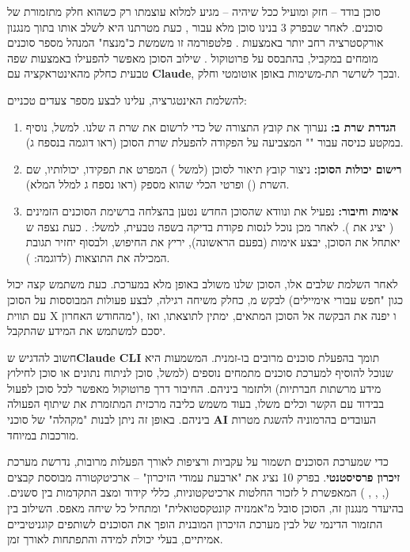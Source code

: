 
סוכן בודד – חזק ומועיל ככל שיהיה – מגיע למלוא עוצמתו רק כשהוא חלק מתזמורת של סוכנים. לאחר שבפרק \num{3} בנינו סוכן  מלא עבור , כעת מטרתנו היא לשלב אותו בתוך מנגנון אורקסטרציה רחב יותר באמצעות . פלטפורמה זו משמשת כ"מנצח" המנהל מספר סוכנים מומחים במקביל, בהתבסס על פרוטוקול . שילוב הסוכן מאפשר להפעילו באמצעות שפה טבעית כחלק מהאינטראקציה עם \textbf{Claude}, ובכך לשרשר תת-משימות באופן אוטומטי וחלק.

להשלמת האינטגרציה, עלינו לבצע מספר צעדים טכניים:
\begin{enumerate}
  \item \textbf{הגדרת שרת ב:} נערוך את קובץ התצורה של  כדי לרשום את שרת ה שלנו. למשל, נוסיף במקטע  כניסה עבור "" המצביעה על הפקודה להפעלת שרת הסוכן (ראו דוגמה בנספח ג).
  \item \textbf{רישום יכולות הסוכן:} ניצור קובץ תיאור לסוכן (למשל ) המפרט את תפקידו, יכולותיו, שם השרת () ופרטי הכלי שהוא מספק (ראו נספח ג למלל המלא).
  \item \textbf{אימות וחיבור:} נפעיל את  ונוודא שהסוכן החדש נטען בהצלחה ברשימת הסוכנים הזמינים ( יציג את ). לאחר מכן נוכל לנסות פקודת בדיקה בשפה טבעית, למשל: . כעת נצפה ש יאתחל את הסוכן, יבצע אימות  (בפעם הראשונה), יריץ את החיפוש, ולבסוף יחזיר תגובת  המכילה את התוצאות (לדוגמה: ).
\end{enumerate}

לאחר השלמת שלבים אלו, הסוכן שלנו משולב באופן מלא במערכת. כעת משתמש קצה יכול לבקש מ, כחלק משיחה רגילה, לבצע פעולות המבוססות על הסוכן (כגון "חפש עבורי אימיילים עם תווית X מהחודש האחרון"), ו יפנה את הבקשה אל הסוכן המתאים, ימתין לתוצאתו, ואז יסכם למשתמש את המידע שהתקבל.

חשוב להדגיש ש\textbf{Claude CLI} תומך בהפעלת סוכנים מרובים בו-זמנית. המשמעות היא שנוכל להוסיף למערכת סוכנים מתמחים נוספים (למשל, סוכן לניתוח נתונים או סוכן לחילוץ מידע מרשתות חברתיות) ולתזמר ביניהם. החיבור דרך פרוטוקול  מאפשר לכל סוכן לפעול בבידוד עם הקשר וכלים משלו, בעוד  משמש כליבה מרכזית המתזמרת את שיתוף הפעולה ביניהם\cite{Anthropic2025}. באופן זה ניתן לבנות "מקהלה" של סוכני \textbf{AI} העובדים בהרמוניה להשגת מטרות מורכבות במיוחד.

כדי שמערכת הסוכנים תשמור על עקביות ורציפות לאורך הפעלות מרובות, נדרשת מערכת \textbf{זיכרון פרסיסטנטי}. בפרק \num{10} נציג את "ארבעת עמודי הזיכרון" – ארכיטקטורה מבוססת קבצים (, , , ) המאפשרת ל לזכור החלטות ארכיטקטוניות, כללי קידוד ומצב התקדמות בין סשנים. בהיעדר מנגנון זה, הסוכן סובל מ"אמנזיה קונטקסטואלית" ומתחיל כל שיחה מאפס. השילוב בין התזמור הדינמי של  לבין מערכת הזיכרון המובנית הופך את הסוכנים לשותפים קוגניטיביים אמיתיים, בעלי יכולת למידה והתפתחות לאורך זמן.
